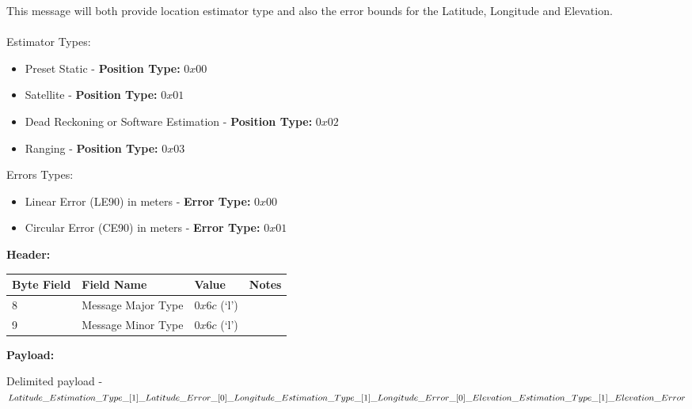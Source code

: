 \begin{framed}
This message will both provide location estimator type and also the error bounds for
the Latitude, Longitude and Elevation.
\\
\\
Estimator Types:
\begin{itemize}

\item Preset Static - \textbf{Position Type:} $0x00$
\item Satellite - \textbf{Position Type:} $0x01$
\item Dead Reckoning or Software Estimation - \textbf{Position Type:} $0x02$
\item Ranging - \textbf{Position Type:} $0x03$

\end{itemize}
Errors Types:
\begin{itemize}
\item Linear Error (LE90) in meters - \textbf{Error Type:} $0x00$
\item Circular Error (CE90) in meters - \textbf{Error Type:} $0x01$
\end{itemize}


\end{framed}

\textbf{Header:}

\begin{center}
    \begin{tabular}{ | l | l | p{3cm} | p{5cm} |}
    \hline
    \hline
    \textbf{Byte Field} & \textbf{Field Name} & \textbf{Value} & \textbf{Notes} \\ \hline \hline
    8 & Message Major Type & $0x6c$ (`l') &  \\    \hline
    9 & Message Minor Type & $0x6c$ (`l') &  \\    \hline
    \end{tabular}
\end{center}
\vskip 0.1in
\noindent
\textbf{Payload:}
\begin{framed}
Delimited payload -
\\
$Latitude\_Estimation\_Type\_[1]\_Latitude\_Error\_[0]\_\\
Longitude\_Estimation\_Type\_[1]\_Longitude\_Error\\
\_[0]\_Elevation\_Estimation\_Type\_[1]\_Elevation\_Error$
\end{framed}


